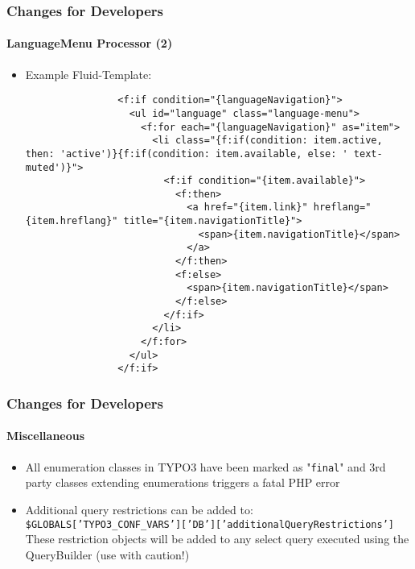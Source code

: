 \begin{frame}[fragile]
	\frametitle{Changes for Developers}
	\framesubtitle{LanguageMenu Processor (2)}

	\lstset{basicstyle=\tiny\ttfamily}

	\begin{itemize}
		\item Example Fluid-Template:

			\begin{lstlisting}
				<f:if condition="{languageNavigation}">
				  <ul id="language" class="language-menu">
				    <f:for each="{languageNavigation}" as="item">
				      <li class="{f:if(condition: item.active, then: 'active')}{f:if(condition: item.available, else: ' text-muted')}">
				        <f:if condition="{item.available}">
				          <f:then>
				            <a href="{item.link}" hreflang="{item.hreflang}" title="{item.navigationTitle}">
				              <span>{item.navigationTitle}</span>
				            </a>
				          </f:then>
				          <f:else>
				            <span>{item.navigationTitle}</span>
				          </f:else>
				        </f:if>
				      </li>
				    </f:for>
				  </ul>
				</f:if>
			\end{lstlisting}

	\end{itemize}

\end{frame}


\begin{frame}[fragile]
	\frametitle{Changes for Developers}
	\framesubtitle{Miscellaneous}

	\begin{itemize}
		\item All enumeration classes in TYPO3 have been marked as "\texttt{final}"
			and 3rd party classes extending enumerations triggers a fatal PHP error
		\item Additional query restrictions can be added to:\newline
			\smaller
				\texttt{\$GLOBALS['TYPO3\_CONF\_VARS']['DB']['additionalQueryRestrictions']}
			\normalsize\newline
			These restriction objects will be added to any select query executed
			using the QueryBuilder (use with caution!)

	\end{itemize}

\end{frame}

